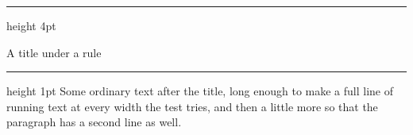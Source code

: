 \documentclass{article}
\begin{document}
\hrule height 4pt
\vskip 0.25in
{\LARGE\centering A title under a rule\par}
\vskip 0.29in
\hrule height 1pt
\vskip 0.09in
Some ordinary text after the title, long enough to make a full line of
running text at every width the test tries, and then a little more so that
the paragraph has a second line as well.
\end{document}

